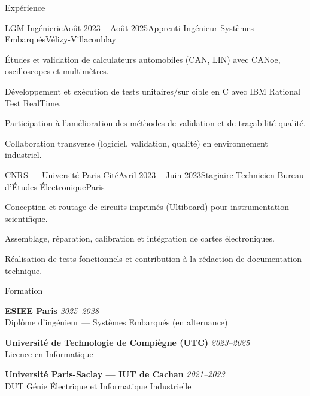 \documentclass[10pt]{style}
\begin{document}
\begin{rSection}{Expérience}

  \begin{rSubsection}{LGM Ingénierie}{Août 2023 -- Août 2025}{Apprenti Ingénieur Systèmes Embarqués}{Vélizy-Villacoublay}
    \item Études et validation de calculateurs automobiles (CAN, LIN) avec CANoe, oscilloscopes et multimètres.  
    \item Développement et exécution de tests unitaires/sur cible en C avec IBM Rational Test RealTime.  
    \item Participation à l’amélioration des méthodes de validation et de traçabilité qualité.  
    \item Collaboration transverse (logiciel, validation, qualité) en environnement industriel.  
  \end{rSubsection}

  \begin{rSubsection}{CNRS — Université Paris Cité}{Avril 2023 -- Juin 2023}{Stagiaire Technicien Bureau d’Études Électronique}{Paris}
    \item Conception et routage de circuits imprimés (Ultiboard) pour instrumentation scientifique.  
    \item Assemblage, réparation, calibration et intégration de cartes électroniques.  
    \item Réalisation de tests fonctionnels et contribution à la rédaction de documentation technique.  
  \end{rSubsection}

\end{rSection}

\begin{rSection}{Formation}

  \textbf{ESIEE Paris} \hfill \textit{2025--2028} \\
  Diplôme d’ingénieur — Systèmes Embarqués (en alternance)  

  \textbf{Université de Technologie de Compiègne (UTC)} \hfill \textit{2023--2025} \\
  Licence en Informatique  

  \textbf{Université Paris-Saclay — IUT de Cachan} \hfill \textit{2021--2023} \\
  DUT Génie Électrique et Informatique Industrielle  

\end{rSection}
\end{document}
